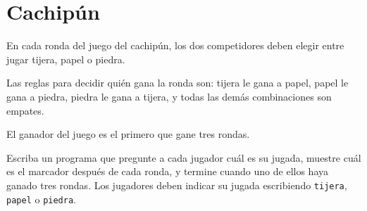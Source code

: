 \section{Cachipún}

En cada ronda del juego del cachipún, los dos competidores deben elegir
entre jugar tijera, papel o piedra.

Las reglas para decidir quién gana la ronda son: tijera le gana a papel,
papel le gana a piedra, piedra le gana a tijera, y todas las demás
combinaciones son empates.

El ganador del juego es el primero que gane tres rondas.

Escriba un programa que pregunte a cada jugador cuál es su jugada,
muestre cuál es el marcador después de cada ronda, y termine cuando uno
de ellos haya ganado tres rondas. Los jugadores deben indicar su jugada
escribiendo \lstinline!tijera!, \lstinline!papel! o \lstinline!piedra!.
